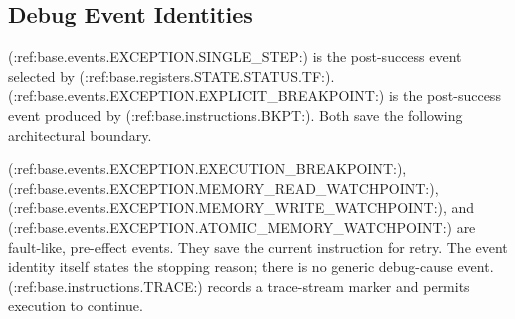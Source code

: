 \subsection{Debug Event Identities}
(:ref:base.events.EXCEPTION.SINGLE_STEP:) is the post-success event selected by (:ref:base.registers.STATE.STATUS.TF:).
(:ref:base.events.EXCEPTION.EXPLICIT_BREAKPOINT:) is the post-success event produced by
(:ref:base.instructions.BKPT:). Both save the following architectural boundary.

(:ref:base.events.EXCEPTION.EXECUTION_BREAKPOINT:),
(:ref:base.events.EXCEPTION.MEMORY_READ_WATCHPOINT:),
(:ref:base.events.EXCEPTION.MEMORY_WRITE_WATCHPOINT:), and
(:ref:base.events.EXCEPTION.ATOMIC_MEMORY_WATCHPOINT:) are fault-like, pre-effect events. They save the current
instruction for retry. The event identity itself states the stopping reason; there is no generic debug-cause event.
(:ref:base.instructions.TRACE:) records a trace-stream marker and permits execution to continue.
